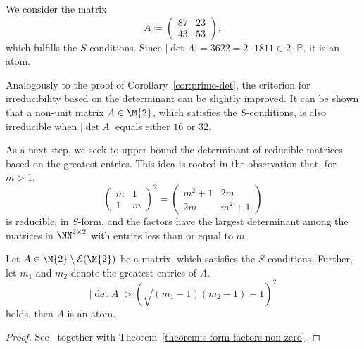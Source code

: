\begin{example}
We consider the matrix 
\[ A \coloneqq \begin{pmatrix} 87 & 23 \\ 43 & 53 \end{pmatrix}, \]
which fulfills the $S$-conditions. Since $ \left \lvert \det{A} \right \rvert = 3622 = 2\cdot 1811 \in 2\cdot\mathbb{P}$, it is an atom.
\end{example}

\begin{remark*}
Analogously to the proof of Corollary~\ref{cor:prime-det}, the criterion for irreducibility based on the determinant can be slightly improved. It can be shown that a non-unit matrix $A \in \M{2}$, which satisfies the $S$-conditions, is also irreducible when  $\left \lvert \det{A} \right \rvert$  equals either $16$ or $32$.
\end{remark*}

As a next step, we seek to upper bound the determinant of reducible matrices based on the greatest entries. This idea is rooted in the observation that, for $m >1$, 
\[ \begin{pmatrix} m & 1 \\ 1 & m \end{pmatrix}^2 = \begin{pmatrix} m^2+1 & 2m \\ 2m & m^2+1 \end{pmatrix}  \]
is reducible, in $S$-form, and the factors have the largest determinant among the matrices in $\NN^{2\times 2}$ with entries less than or equal to $m$.

\begin{theorem}\label{theorem:det-bound}
Let $A \in \M{2}\setminus\mathcal{E}(\M{2})$ be a matrix, which satisfies the $S$-conditions. Further, let $m_1$ and $m_2$ denote the greatest entries of $A$. 
\[  \left \lvert \det{A} \right \rvert  > (\sqrt{(m_1-1)(m_2-1)}-1)^2 \]
holds, then $A$ is an atom.
\end{theorem}

\begin{proof} 
See~\cite[Theorem 3.3 and Remark]{Schmucker2023} together with Theorem~\ref{theorem:s-form-factors-non-zero}.
\end{proof}

